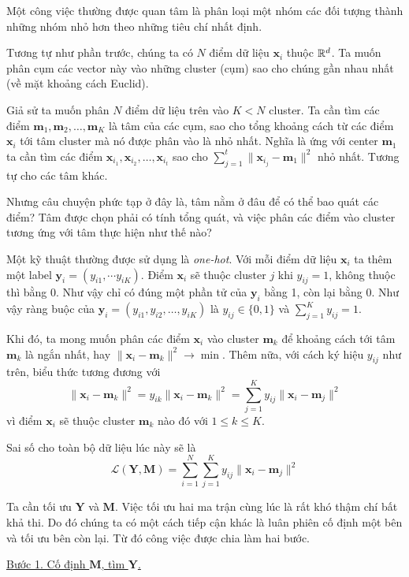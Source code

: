 Một công việc thường được quan tâm là phân loại một nhóm các đối tượng thành những nhóm nhỏ hơn theo những tiêu chí nhất định.

Tương tự như phần trước, chúng ta có $N$ điểm dữ liệu $\bm{x}_i$ thuộc $\mathbb{R}^d$. Ta muốn phân cụm các vector này vào những cluster (cụm) sao cho chúng gần nhau nhất (về mặt khoảng cách Euclid).

Giả sử ta muốn phân $N$ điểm dữ liệu trên vào $K < N$ cluster. Ta cần tìm các điểm $\bm{m}_1, \bm{m}_2, \ldots, \bm{m}_K$ là tâm của các cụm, sao cho tổng khoảng cách từ các điểm $\bm{x}_i$ tới tâm cluster mà nó được phân vào là nhỏ nhất. Nghĩa là ứng với center $\bm{m}_1$ ta cần tìm các điểm $\bm{x}_{i_1}, \bm{x}_{i_2}, \ldots, \bm{x}_{i_t}$ sao cho $\sum_{j=1}^t \lVert \bm{x}_{i_j} - \bm{m}_1 \rVert^2$ nhỏ nhất. Tương tự cho các tâm khác.

Nhưng câu chuyện phức tạp ở đây là, tâm nằm ở đâu để có thể bao quát các điểm? Tâm được chọn phải có tính tổng quát, và việc phân các điểm vào cluster tương ứng với tâm thực hiện như thế nào?

Một kỹ thuật thường được sử dụng là \textit{one-hot}. Với mỗi điểm dữ liệu $\bm{x}_i$ ta thêm một label $\bm{y}_i = (y_{i1}, \cdots y_{iK})$. Điểm $\bm{x}_i$ sẽ thuộc cluster $j$ khi $y_{ij} = 1$, không thuộc thì bằng 0. Như vậy chỉ có đúng một phần tử của $\bm{y}_i$ bằng 1, còn lại bằng 0. Như vậy ràng buộc của $\bm{y}_i = (y_{i1}, y_{i2}, \ldots, y_{iK})$ là $y_{ij} \in \{ 0, 1 \}$ và $\sum_{j=1}^K y_{ij} = 1$.

Khi đó, ta mong muốn phân các điểm $\bm{x}_i$ vào cluster $\bm{m}_k$ để khoảng cách tới tâm $\bm{m}_k$ là ngắn nhất, hay $\lVert \bm{x}_i - \bm{m}_k \rVert^2 \to \min$. Thêm nữa, với cách ký hiệu $y_{ij}$ như trên, biểu thức tương đương với \[ \lVert \bm{x}_i - \bm{m}_k \rVert^2 = y_{ik} \lVert \bm{x}_i - \bm{m}_k \rVert^2 = \sum_{j=1}^K y_{ij} \lVert \bm{x}_i - \bm{m}_j \rVert^2 \] vì điểm $\bm{x}_i$ sẽ thuộc cluster $\bm{m}_k$ nào đó với $1 \leq k \leq K$.

Sai số cho toàn bộ dữ liệu lúc này sẽ là \[ \mathcal{L} (\bm{Y}, \bm{M}) = \sum_{i=1}^N \sum_{j=1}^K y_{ij} \lVert \bm{x}_i - \bm{m}_j \rVert^2 \]

Ta cần tối ưu $\bm{Y}$ và $\bm{M}$. Việc tối ưu hai ma trận cùng lúc là rất khó thậm chí bất khả thi. Do đó chúng ta có một cách tiếp cận khác là luân phiên cố định một bên và tối ưu bên còn lại. Từ đó công việc được chia làm hai bước.

\underline{Bước 1. Cố định $\bm{M}$, tìm $\bm{Y}$.}


